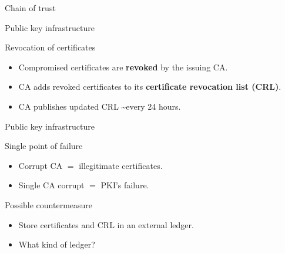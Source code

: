 \begin{frame}{Chain of trust }
\begin{center}
\end{center}
\end{frame}



\begin{frame}{Public key infrastructure}
\begin{exampleblock}{Revocation of certificates}
\begin{itemize}
\item Compromised certificates are
\textbf{revoked} by the issuing CA.
\item CA adds revoked certificates to its
\textbf{certificate revocation list (CRL)}.
\item CA publishes updated CRL
\textasciitilde every 24 hours.
\end{itemize}
\end{exampleblock}
\end{frame}

\begin{frame}{Public key infrastructure}

\begin{alertblock}{Single point of failure}
\begin{itemize}
\item Corrupt CA $=$ illegitimate
certificates.
\item Single CA corrupt $=$ PKI's failure.
\end{itemize}
\end{alertblock}

\pause

\begin{exampleblock}{Possible countermeasure}
\begin{itemize}
\item Store certificates and CRL
in an external ledger.
\item What kind of ledger?
\end{itemize}
\end{exampleblock}

\end{frame}


